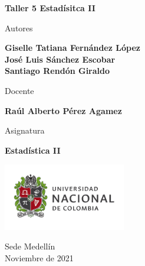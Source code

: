 \begin{titlepage}
   \Large{
   \begin{center}
       \vspace*{1cm}

       \textbf{Taller 5 Estadísitca II}

            
       \vspace{1cm}
       
       Autores
       
       \vspace{0.5cm}
        
        
       \textbf{Giselle Tatiana Fernández López} \\
       \textbf{José Luis Sánchez Escobar} \\
       \textbf{Santiago Rendón Giraldo} \\

       
              \vspace{1cm}
       
       Docente
       
       \vspace{0.5cm}

	\textbf{Raúl Alberto Pérez Agamez} 
       
       \vspace{0.4cm}

       \vspace{1.5cm}
       
       Asignatura
       
       \vspace{0.5cm}

       \textbf{Estadística II}

       \vfill

            
       \vspace{0.1cm}
     
       \includegraphics[width=0.4\textwidth]{logounal.png}
            
       Sede Medellín\\
       Noviembre de 2021
       
   \end{center}
   }
\end{titlepage}